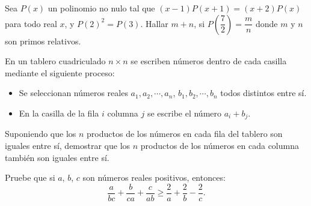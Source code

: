 \begin{section-problem}
    Sea $P(x)$ un polinomio no nulo tal que $(x - 1)P(x + 1) = (x + 2)P(x)$ para todo real $x$, y $P(2)^2 = P(3)$.
    Hallar $m + n$, si $P\left(\dfrac{7}{2}\right) = \dfrac{m}{n}$ donde $m$ y $n$ son primos relativos.
\end{section-problem}

\begin{section-problem}
    En un tablero cuadriculado $n \times n$ se escriben números dentro de cada casilla mediante el siguiente proceso:
    \begin{itemize}
        \item Se seleccionan números reales $a_1, a_2, \cdots, a_n$, $b_1, b_2, \cdots, b_n$ todos distintos entre sí.
        \item En la casilla de la fila $i$ columna $j$ se escribe el número $a_i + b_j$.
    \end{itemize}
    Suponiendo que los $n$ productos de los números en cada fila del tablero son iguales entre sí, demostrar que los $n$ productos de los números en cada columna también son iguales entre sí.
\end{section-problem}

\begin{section-problem}
    Pruebe que si $a$, $b$, $c$ son números reales positivos, entonces:
    \[\frac{a}{bc} + \frac{b}{ca} + \frac{c}{ab} \geq \frac{2}{a} + \frac{2}{b} - \frac{2}{c}.\]
\end{section-problem}